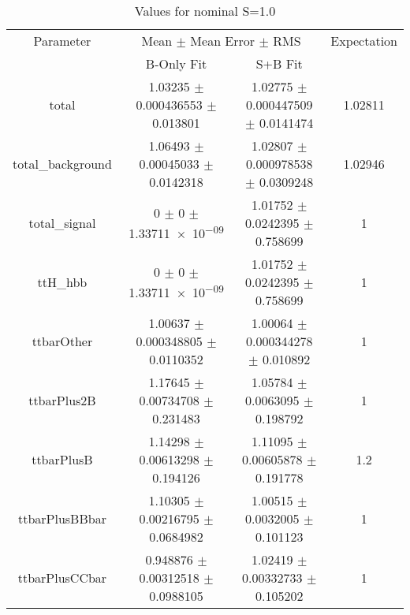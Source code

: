 \begin{table}
\centering
\caption{Values for nominal S=1.0}
\begin{tabular}{cccc}
\toprule
Parameter & \multicolumn{2}{c}{Mean $\pm$ Mean Error $\pm$ RMS} & Expectation\\
 & B-Only Fit & S+B Fit & \\
\midrule
total & \num{1.03235} $\pm$ \num{0.000436553} $\pm$ \num{0.013801} & \num{1.02775} $\pm$ \num{0.000447509} $\pm$ \num{0.0141474} & \num{1.02811}\\
total\_background & \num{1.06493} $\pm$ \num{0.00045033} $\pm$ \num{0.0142318} & \num{1.02807} $\pm$ \num{0.000978538} $\pm$ \num{0.0309248} & \num{1.02946}\\
total\_signal & \num{0} $\pm$ \num{0} $\pm$ \num{1.33711e-09} & \num{1.01752} $\pm$ \num{0.0242395} $\pm$ \num{0.758699} & \num{1}\\
ttH\_hbb & \num{0} $\pm$ \num{0} $\pm$ \num{1.33711e-09} & \num{1.01752} $\pm$ \num{0.0242395} $\pm$ \num{0.758699} & \num{1}\\
ttbarOther & \num{1.00637} $\pm$ \num{0.000348805} $\pm$ \num{0.0110352} & \num{1.00064} $\pm$ \num{0.000344278} $\pm$ \num{0.010892} & \num{1}\\
ttbarPlus2B & \num{1.17645} $\pm$ \num{0.00734708} $\pm$ \num{0.231483} & \num{1.05784} $\pm$ \num{0.0063095} $\pm$ \num{0.198792} & \num{1}\\
ttbarPlusB & \num{1.14298} $\pm$ \num{0.00613298} $\pm$ \num{0.194126} & \num{1.11095} $\pm$ \num{0.00605878} $\pm$ \num{0.191778} & \num{1.2}\\
ttbarPlusBBbar & \num{1.10305} $\pm$ \num{0.00216795} $\pm$ \num{0.0684982} & \num{1.00515} $\pm$ \num{0.0032005} $\pm$ \num{0.101123} & \num{1}\\
ttbarPlusCCbar & \num{0.948876} $\pm$ \num{0.00312518} $\pm$ \num{0.0988105} & \num{1.02419} $\pm$ \num{0.00332733} $\pm$ \num{0.105202} & \num{1}\\
\bottomrule
\end{tabular}
\end{table}